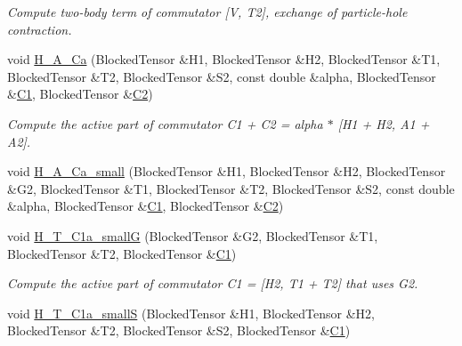 \begin{DoxyCompactItemize}
\begin{DoxyCompactList}\small\item\em Compute two-\/body term of commutator \mbox{[}V, T2\mbox{]}, exchange of particle-\/hole contraction. \end{DoxyCompactList}\item 
void \mbox{\hyperlink{classforte_1_1_s_a_d_s_r_g_a220a2a913a49b18bc30167ba32a0c722}{H\+\_\+\+A\+\_\+\+Ca}} (Blocked\+Tensor \&H1, Blocked\+Tensor \&H2, Blocked\+Tensor \&T1, Blocked\+Tensor \&T2, Blocked\+Tensor \&S2, const double \&alpha, Blocked\+Tensor \&\mbox{\hyperlink{namespaceforte_abe00ec86d0015c0f2b6ac298c6e428e4a1a2ddc2db4693cfd16d534cde5572cc1}{C1}}, Blocked\+Tensor \&\mbox{\hyperlink{namespaceforte_abe00ec86d0015c0f2b6ac298c6e428e4af1a543f5a2c5d49bc5dde298fcf716e4}{C2}})
\begin{DoxyCompactList}\small\item\em Compute the active part of commutator C1 + C2 = alpha $\ast$ \mbox{[}H1 + H2, A1 + A2\mbox{]}. \end{DoxyCompactList}\item 
void \mbox{\hyperlink{classforte_1_1_s_a_d_s_r_g_a20d36dbff8733f76b980770ec9008ec0}{H\+\_\+\+A\+\_\+\+Ca\+\_\+small}} (Blocked\+Tensor \&H1, Blocked\+Tensor \&H2, Blocked\+Tensor \&G2, Blocked\+Tensor \&T1, Blocked\+Tensor \&T2, Blocked\+Tensor \&S2, const double \&alpha, Blocked\+Tensor \&\mbox{\hyperlink{namespaceforte_abe00ec86d0015c0f2b6ac298c6e428e4a1a2ddc2db4693cfd16d534cde5572cc1}{C1}}, Blocked\+Tensor \&\mbox{\hyperlink{namespaceforte_abe00ec86d0015c0f2b6ac298c6e428e4af1a543f5a2c5d49bc5dde298fcf716e4}{C2}})
\item 
void \mbox{\hyperlink{classforte_1_1_s_a_d_s_r_g_a8b34a6c248c3051ec9018264a740c706}{H\+\_\+\+T\+\_\+\+C1a\+\_\+smallG}} (Blocked\+Tensor \&G2, Blocked\+Tensor \&T1, Blocked\+Tensor \&T2, Blocked\+Tensor \&\mbox{\hyperlink{namespaceforte_abe00ec86d0015c0f2b6ac298c6e428e4a1a2ddc2db4693cfd16d534cde5572cc1}{C1}})
\begin{DoxyCompactList}\small\item\em Compute the active part of commutator C1 = \mbox{[}H2, T1 + T2\mbox{]} that uses G2. \end{DoxyCompactList}\item 
void \mbox{\hyperlink{classforte_1_1_s_a_d_s_r_g_acb9522a430314033b70982dd58dd2c1d}{H\+\_\+\+T\+\_\+\+C1a\+\_\+smallS}} (Blocked\+Tensor \&H1, Blocked\+Tensor \&H2, Blocked\+Tensor \&T2, Blocked\+Tensor \&S2, Blocked\+Tensor \&\mbox{\hyperlink{namespaceforte_abe00ec86d0015c0f2b6ac298c6e428e4a1a2ddc2db4693cfd16d534cde5572cc1}{C1}})

\end{DoxyCompactItemize}
